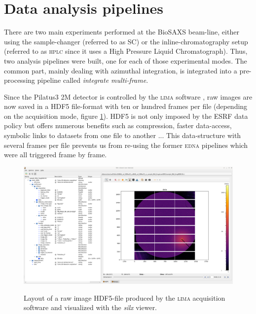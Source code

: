 \documentclass[preprint]{iucr}              %
\begin{document}
\section{Data analysis pipelines}
\label{pipeline}
There are two main experiments performed at the BioSAXS beam-line, either using the sample-changer (referred to as SC) or the inline-chromatography setup (referred to as \textsc{hplc} since it uses a High Pressure Liquid Chromatograph).
Thus, two analysis pipelines were built, one for each of those experimental modes.
The common part, mainly dealing with azimuthal integration, is integrated into a pre-processing pipeline called \textit{integrate multi-frame}.

Since the Pilatus3 2M detector is controlled by the \textsc{lima} software \cite{lima}, raw images are now saved in a HDF5 file-format \cite{hdf5} with ten or hundred frames per file (depending on the acquisition mode, figure \ref{lima}).
HDF5 is not only imposed by the ESRF data policy  \cite{data-policy} but offers numerous benefits such as compression, faster data-access, symbolic links to datasets from one file to another ...
This data-structure with several frames per file prevents us from re-using the former \textsc{edna} pipelines which were  all triggered frame by frame.

\begin{figure}
     \caption{Layout of a raw image HDF5-file produced by the \textsc{lima} acquisition software and visualized with the \textit{silx} viewer.}
     \includegraphics[width=12cm]{lima.eps}
     \label{lima}
\end{figure}
\end{document}

